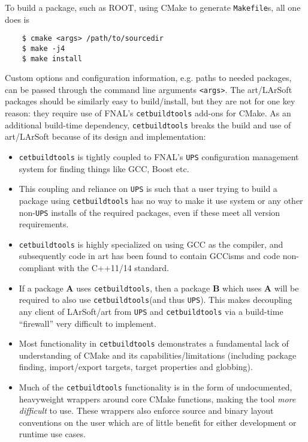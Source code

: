\documentclass[usletter]{article}
\newcommand{\code}[1]{\texttt{#1}}
\newcommand{\ups}{\code{UPS}\xspace}
\newcommand{\cetbuildtools}{\code{cetbuildtools}\xspace}
\newcommand{\art}{art\xspace}
\newcommand{\larsoft}{LArSoft\xspace}
\begin{document}
To build a package, such as ROOT, using CMake to generate \texttt{Makefile}s, all one
does is
\begin{verbatim}
    $ cmake <args> /path/to/sourcedir
    $ make -j4
    $ make install
 \end{verbatim}

Custom options and configuration information, e.g. paths to needed packages,
can be passed through the command line arguments \verb|<args>|. The \art/\larsoft
packages should be similarly easy to build/install, but they are not for one
key reason: they require use of FNAL's \cetbuildtools add-ons for CMake.
As an additional build-time dependency, \cetbuildtools breaks the build
and use of \art/\larsoft because of its design and implementation:
\begin{itemize}

	\item \cetbuildtools is tightly coupled to FNAL's \ups configuration
  management system for finding things like GCC, Boost etc.
  
	\item This coupling and reliance on \ups is such that a user trying to build a
  package using \cetbuildtools has no way to
  make it use system or any other non-\ups installs of the required packages,
  even if these meet all version requirements.
  
	\item \cetbuildtools is highly specialized on using GCC as the compiler, and
  subsequently code in \art has been found to contain GCCisms and code
  non-compliant with the C++11/14 standard.
  
	\item If a package \textbf{A} uses \cetbuildtools, then a package \textbf{B} which uses \textbf{A}
  will be required to also use \cetbuildtools (and thus \ups). This makes
  decoupling any client of \larsoft/\art from \ups and \cetbuildtools via
  a build-time ``firewall'' very difficult to implement.
  
	\item Most functionality in \cetbuildtools demonstrates a fundamental
  lack of understanding of CMake and its capabilities/limitations (including
  package finding, import/export targets, target properties and globbing).
  
	\item Much of the \cetbuildtools functionality is in the form of undocumented,
  heavyweight wrappers around core CMake functions, making the tool \textit{more
  difficult} to use. These wrappers also enforce source and binary layout
  conventions on the user which are of little benefit for either development
  or runtime use cases.
\end{itemize}
\end{document}

